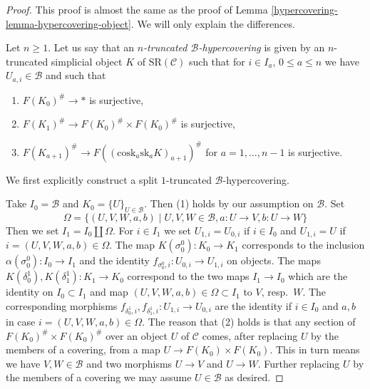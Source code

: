 \begin{proof}

This proof is almost the same as the proof of
Lemma \ref{hypercovering-lemma-hypercovering-object}. We will
only explain the differences.

\medskip\noindent
Let $n \geq 1$. Let us say that an
{\it $n$-truncated $\mathcal{B}$-hypercovering}
is given by an $n$-truncated simplicial
object $K$ of $\text{SR}(\mathcal{C})$
such that for $i \in I_a$, $0 \leq a \leq n$
we have $U_{a, i} \in \mathcal{B}$ and such that
\begin{enumerate}
\item $F(K_0)^\# \to *$ is surjective,
\item $F(K_1)^\# \to F(K_0)^\# \times F(K_0)^\#$ is surjective,
\item $F(K_{a + 1})^\# \to F((\text{cosk}_a \text{sk}_a K)_{a + 1})^\#$
for $a = 1, \ldots, n - 1$ is surjective.
\end{enumerate}
We first explicitly construct a split $1$-truncated $\mathcal{B}$-hypercovering.

\medskip\noindent
Take $I_0 = \mathcal{B}$ and $K_0 = \{U\}_{U \in \mathcal{B}}$.
Then (1) holds by our assumption on $\mathcal{B}$. Set
$$
\Omega =
\{(U, V, W, a, b) \mid U, V, W \in \mathcal{B}, a : U \to V, b : U \to W\}
$$
Then we set $I_1 = I_0 \amalg \Omega$. For $i \in I_1$ we set
$U_{1, i} = U_{0, i}$ if $i \in I_0$ and $U_{1, i} = U$
if $i = (U, V, W, a, b) \in \Omega$. The map
$K(\sigma^0_0) : K_0 \to K_1$ corresponds to the
inclusion $\alpha(\sigma^0_0) : I_0 \to I_1$
and the identity $f_{\sigma^0_0, i} : U_{0, i} \to U_{1, i}$
on objects. The maps $K(\delta^1_0), K(\delta^1_1) : K_1 \to K_0$
correspond to the two maps $I_1 \to I_0$ which are the
identity on $I_0 \subset I_1$ and map $(U, V, W, a, b) \in \Omega \subset I_1$
to $V$, resp.\ $W$. The corresponding morphisms
$f_{\delta^1_0, i}, f_{\delta^1_1, i} : U_{1, i} \to U_{0, i}$ are
the identity if $i \in I_0$ and $a, b$ in case $i = (U, V, W, a, b) \in \Omega$.
The reason that (2) holds is that any section of
$F(K_0)^\# \times F(K_0)^\#$ over an object $U$ of $\mathcal{C}$
comes, after replacing $U$ by the members of a covering,
from a map $U \to F(K_0) \times F(K_0)$.
This in turn means we have $V, W \in \mathcal{B}$
and two morphisms $U \to V$ and $U \to W$. Further replacing
$U$ by the members of a covering we may assume $U \in \mathcal{B}$
as desired.


\end{proof}
